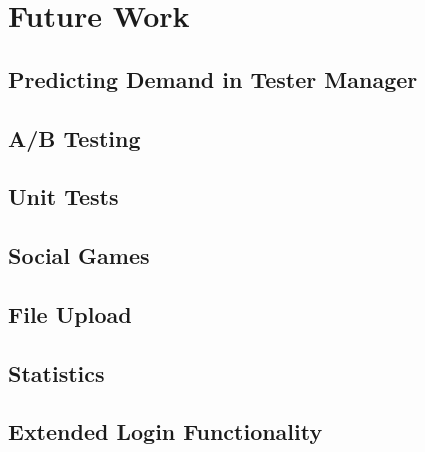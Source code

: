 \chapter{Future Work}

\section{Predicting Demand in Tester Manager}


\section{A/B Testing}


\section{Unit Tests}


\section{Social Games}


\section{File Upload}


\section{Statistics}


\section{Extended Login Functionality}


